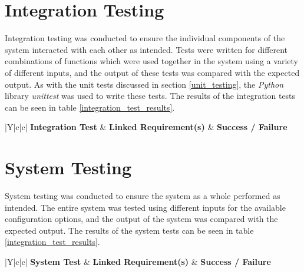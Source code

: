 \section{Integration Testing}
\label{integration_testing}
Integration testing was conducted to ensure the individual components of the system interacted with each other as intended.
Tests were written for different combinations of functions which were used together in the system using a variety of different inputs, and the output of these tests was compared with the expected output.
As with the unit tests discussed in section \ref{unit_testing}, the \textit{Python} library \textit{unittest} was used to write these tests.
The results of the integration tests can be seen in table \ref{integration_test_results}.

\begin{table}[t]
  \caption{Results of Integration Tests}
  \begin{center}
    \begin{tabularx}{\textwidth}{|Y|c|c|} \hline
      \textbf{Integration Test} & \textbf{Linked Requirement(s)} & \textbf{Success / Failure} \\ \thickhline

    \end{tabularx}
  \end{center}
  \label{integration_test_results}
\end{table}

\section{System Testing}
\label{system_testing}
System testing was conducted to ensure the system as a whole performed as intended.
The entire system was tested using different inputs for the available configuration options, and the output of the system was compared with the expected output.
The results of the system tests can be seen in table \ref{integration_test_results}.


\begin{table}[t]
  \caption{Results of System Tests}
  \begin{center}
    \begin{tabularx}{\textwidth}{|Y|c|c|} \hline
      \textbf{System Test} & \textbf{Linked Requirement(s)} & \textbf{Success / Failure} \\ \thickhline

    \end{tabularx}
  \end{center}
  \label{system_test_results}
\end{table}


